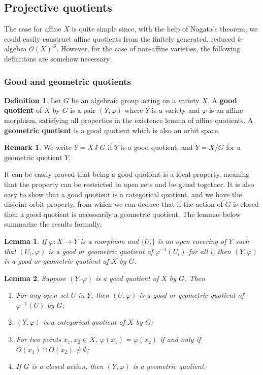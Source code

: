 \documentclass[12pt]{article}
\newtheorem{lemma}{Lemma}[section]
\theoremstyle{remark}
\theoremstyle{definition}
\newtheorem{remark}{Remark}[section]
\newtheorem{definition}{Definition}[section]
\begin{document}
    \subsection{Projective quotients}
    The case for affine $X$ is quite simple since, with the help of Nagata's theorem, we could easily construct affine quotients from the finitely generated, reduced $k$-algebra $\mathcal O(X)^G$. However, for the case of non-affine varieties, the following definitions are somehow necessary.
    \subsubsection{Good and geometric quotients}
    \begin{definition}
        Let $G$ be an algebraic group acting on a variety $X$. A \textbf{good quotient} of $X$ by $G$ is a pair $(Y,\varphi)$ where $Y$ is a variety and $\varphi$ is an affine morphism, satisfying all properties in the existence lemma of affine quotients. A \textbf{geometric quotient} is a good quotient which is also an orbit space.
    \end{definition}
    \begin{remark}
        We write $Y=X{\sslash}G$ if $Y$ is a good quotient, and $Y=X/G$ for a geometric quotient $Y$.
    \end{remark}
    It can be easily proved that being a good quotient is a local property, meaning that the property can be restricted to open sets and be glued together. It is also easy to show that a good quotient is a categorical quotient, and we have the disjoint orbit property, from which we can deduce that if the action of $G$ is closed then a good quotient is necessarily a geometric quotient. The lemmas below summarize the results formally:
    \begin{lemma}
        If $\varphi:X\to Y$ is a morphism and $\{U_i\}$ is an open covering of $Y$ such that $(U_i,\varphi)$ is a good or geometric quotient of $\varphi^{-1}(U_i)$ for all $i$, then $(Y,\varphi)$ is a good or geometric quotient of $X$ by $G$.
    \end{lemma}
    \begin{lemma}
        Suppose $(Y,\varphi)$ is a good quotient of $X$ by $G$. Then
        \begin{enumerate}[\normalfont(i)]
            \item For any open set $U$ in $Y$, then $(U,\varphi)$ is a good or geometric quotient of $\varphi^{-1}(U)$ by $G$;
            \item $(Y,\varphi)$ is a categorical quotient of $X$ by $G$;
            \item For two points $x_1,x_2\in X$, $\varphi(x_1)=\varphi(x_2)$ if and only if $\overline{O(x_1)}\cap \overline{O(x_2)}\neq\emptyset$;
            \item If $G$ is a closed action, then $(Y,\varphi)$ is a geometric quotient.
        \end{enumerate}
    \end{lemma}
\end{document}
